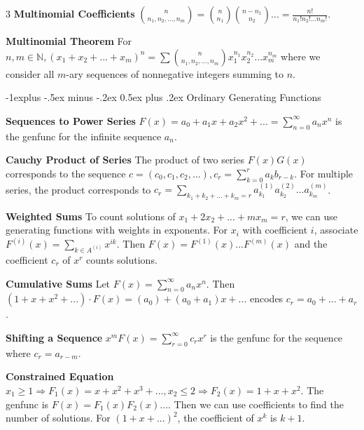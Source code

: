 \documentclass[10pt, landscape]{article}
\makeatletter
\renewcommand{\section}{\@startsection{section}{1}{0mm}%
                                {-1ex plus -.5ex minus -.2ex}%
                                {0.5ex plus .2ex}%
                                {\normalfont\large\bfseries}}
\renewcommand{\section}{\@startsection{section}{2}{0mm}%
                                {-1explus -.5ex minus -.2ex}%
                                {0.5ex plus .2ex}%
                                {\normalfont\normalsize\bfseries}}
\makeatother
\begin{document}
\begin{multicols*}{3}
\textbf{Multinomial Coefficients} ${n \choose {n_1,n_2,...,n_m}}={n \choose n_1}{n - n_1 \choose n_2}...=\frac{n!}{n_1!n_2!...n_m!}$.

\textbf{Multinomial Theorem} For $n,m \in \mathbb{N}, (x_1+x_2+...+x_m)^n=\sum{n \choose {n_1,n_2,...,n_m}}x_1^{n_1}x_2^{n_2}...x_m^{n_m}$ where we consider all $m$-ary sequences of nonnegative integers summing to $n$.

\section{Ordinary Generating Functions}


\textbf{Sequences to Power Series} $F(x)=a_0+a_1x+a_2x^2+...=\sum_{n=0}^\infty a_nx^n$ is the genfunc for the infinite sequence $a_n$.

\textbf{Cauchy Product of Series} The product of two series $F(x)G(x)$ corresponds to the sequence $c=(c_0, c_1, c_2,...), c_r=\sum_{k=0}^ra_kb_{r-k}$. For multiple series, the product corresponds to $c_r=\sum_{k_1+k_2+...+k_m=r}a_{k_1}^{(1)}a_{k_2}^{(2)}...a_{k_m}^{(m)}$.


\textbf{Weighted Sums} To count solutions of $x_1+2x_2+...+mx_m=r$, we can use generating functions with weights in exponents. For $x_i$ with coefficient $i$, associate $F^{(i)}(x)=\sum_{k\in A^{(i)}}x^{ik}$. Then $F(x)=F^{(1)}(x)...F^{(m)}(x)$ and the coefficient $c_r$ of $x^r$ counts solutions.

\textbf{Cumulative Sums} Let $F(x)=\sum_{n=0}^\infty a_n x^n$. Then $(1+x+x^2+...)\cdot F(x)=(a_0)+(a_0+a_1)x+...$ encodes $c_r=a_0+...+a_r$.

\textbf{Shifting a Sequence} $x^mF(x)=\sum_{r=0}^\infty c_rx^r$ is the genfunc for the sequence where $c_r=a_{r-m}$. 

\textbf{Constrained Equation} $x_1 \geq 1 \Rightarrow F_1(x)=x+x^2+x^3+..., x_2 \leq 2 \Rightarrow F_2(x)=1+x+x^2$. The genfunc is $F(x)=F_1(x)F_2(x)...$. Then we can use coefficients to find the number of solutions. For $(1+x+...)^2$, the coefficient of $x^k$ is $k+1$.


\end{multicols*}
\end{document}
